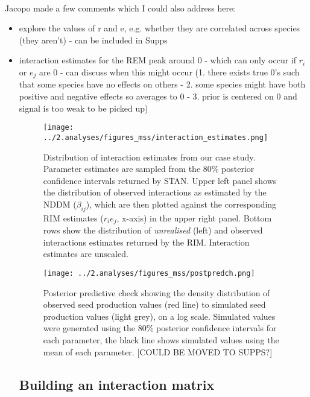\documentclass[a4,12pt]{article}
\begin{document}
    \paragraph{}
        Jacopo made a few comments which I could also address here: 
        \begin{itemize}
            \item explore the values of r and e, e.g. whether they are correlated across species (they aren't) - can be included in Supps
            \item interaction estimates for the REM peak around 0 - which can only occur if $r_i$ or $e_j$ are 0 - can discuss when this might occur (1. there exists true 0's such that some species have no effects on others - 2. some species might have both positive and negative effects so averages to 0 - 3. prior is centered on 0 and signal is too weak to be picked up)


    \begin{figure}[H]
        \texttt{[image: ../2.analyses/figures\_mss/interaction\_estimates.png]}
        \caption{Distribution of interaction estimates from our case study. Parameter estimates are sampled from the 80\% posterior confidence intervals returned by STAN. Upper left panel shows the distribution of observed interactions as estimated by the NDDM ($\beta_{ij}$), which are then plotted against the corresponding RIM estimates ($r_i e_j$, x-axis) in the upper right panel. Bottom rows show the distribution of \textit{unrealised} (left) and observed interactions estimates returned by the RIM. Interaction estimates are unscaled.}
        \label{fig:adist}
    \end{figure}

    \begin{figure}[H]
        \texttt{[image: ../2.analyses/figures\_mss/postpredch.png]}
        \caption{Posterior predictive check showing the density distribution of observed seed production values (red line) to simulated seed production values (light grey), on a log scale. Simulated values were generated using the 80\% posterior confidence intervals for each parameter, the black line shows simulated values using the mean of each parameter. [COULD BE MOVED TO SUPPS?]}
        \label{fig:ppcheck}
    \end{figure}
  

    \subsection{Building an interaction matrix}
    

\end{itemize}
\end{document}

